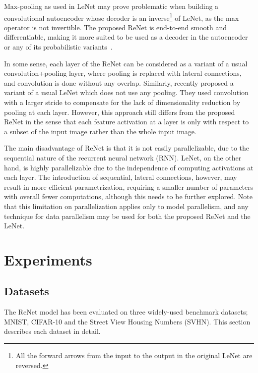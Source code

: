 Max-pooling as used in LeNet may prove problematic when building a
convolutional autoencoder whose decoder is an inverse\footnote{
    All the forward arrows from the input to the output in the original LeNet
    are reversed.
}
of LeNet, as the max operator is not invertible. The proposed
ReNet is end-to-end smooth and differentiable, making it more suited to be used
as a decoder in the autoencoder or any of its probabilistic variants~\citep[see,
e.g.,][]{Kingma+Welling-ICLR2014}.

In some sense, each layer of the ReNet can be considered as a variant of a usual
convolution+pooling layer, where pooling is replaced with lateral connections,
and convolution is done without any overlap. Similarly, \citet{Springenberg2014}
recently proposed a variant of a usual LeNet which does not use any pooling.
They used convolution with a larger stride to compensate for the lack of
dimensionality reduction by pooling at each layer. However, this approach still
differs from the proposed ReNet in the sense that each feature activation at a
layer is only with respect to a subset of the input image rather than the whole
input image.

The main disadvantage of ReNet is that it is not easily parallelizable, due to
the sequential nature of the recurrent neural network (RNN). LeNet, on the other
hand, is highly parallelizable due to the independence of computing activations
at each layer. The introduction of sequential, lateral connections, however, may
result in more efficient parametrization, requiring a smaller number of
parameters with overall fewer computations, although this needs to be further
explored. Note that this limitation on parallelization applies only to model
parallelism, and any technique for data parallelism may be used for both the
proposed ReNet and the LeNet.

\section{Experiments}\label{sec:renet_results}

\subsection{Datasets}

The ReNet model has been evaluated on three widely-used benchmark datasets;
MNIST, CIFAR-10 and the Street View Housing Numbers (SVHN). This section
describes each dataset in detail.

